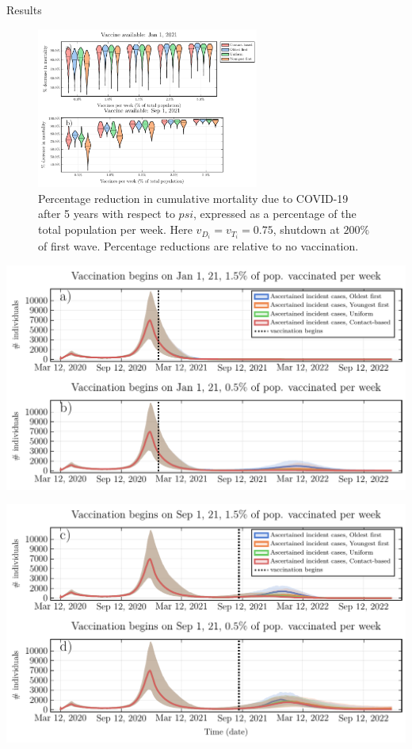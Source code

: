 \documentclass{beamer}
\begin{document}
\begin{frame}{Results}
            \begin{figure}
                \includegraphics[width = 0.65\textwidth]{covid/vaccination_by_mortality_small.pdf}
                
                \caption{Percentage reduction in cumulative mortality due to COVID-19 after 5 years with respect to $psi$, expressed as a percentage of the total population per week. Here $v_{D_i} = v_{T_i} = 0.75 $, shutdown at $200\%$ of first wave. Percentage reductions are relative to no vaccination. }
            \end{figure}
\end{frame}
\begin{frame}{}
    \includegraphics[width = \textwidth]{covid/main_text_ts_1.pdf}
\end{frame}
\begin{frame}{}
    \includegraphics[width = \textwidth]{covid/main_text_ts_2.pdf}
\end{frame}
\end{document}
